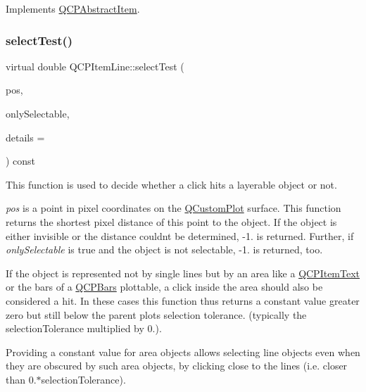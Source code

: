 Implements \hyperlink{class_q_c_p_abstract_item_ae41d0349d68bb802c49104afd100ba2a}{Q\+C\+P\+Abstract\+Item}.

\mbox{\label{class_q_c_p_item_line_a6ab9156f12d5f4cf23bf24121c2bf97c}} 
\subsubsection{\texorpdfstring{select\+Test()}{selectTest()}\hspace{0.1cm}{\footnotesize\ttfamily [2/2]}}
{\footnotesize\ttfamily virtual double Q\+C\+P\+Item\+Line\+::select\+Test (\begin{DoxyParamCaption}\item[{const Q\+PointF \&}]{pos,  }\item[{bool}]{only\+Selectable,  }\item[{Q\+Variant $\ast$}]{details = {} }\end{DoxyParamCaption}) const\hspace{0.3cm}{\ttfamily [virtual]}}

This function is used to decide whether a click hits a layerable object or not.

{\itshape pos} is a point in pixel coordinates on the \hyperlink{class_q_custom_plot}{Q\+Custom\+Plot} surface. This function returns the shortest pixel distance of this point to the object. If the object is either invisible or the distance couldn\textquotesingle{}t be determined, -\/1. is returned. Further, if {\itshape only\+Selectable} is true and the object is not selectable, -\/1. is returned, too.

If the object is represented not by single lines but by an area like a \hyperlink{class_q_c_p_item_text}{Q\+C\+P\+Item\+Text} or the bars of a \hyperlink{class_q_c_p_bars}{Q\+C\+P\+Bars} plottable, a click inside the area should also be considered a hit. In these cases this function thus returns a constant value greater zero but still below the parent plot\textquotesingle{}s selection tolerance. (typically the selection\+Tolerance multiplied by 0.).

Providing a constant value for area objects allows selecting line objects even when they are obscured by such area objects, by clicking close to the lines (i.\+e. closer than 0.$\ast$selection\+Tolerance).


